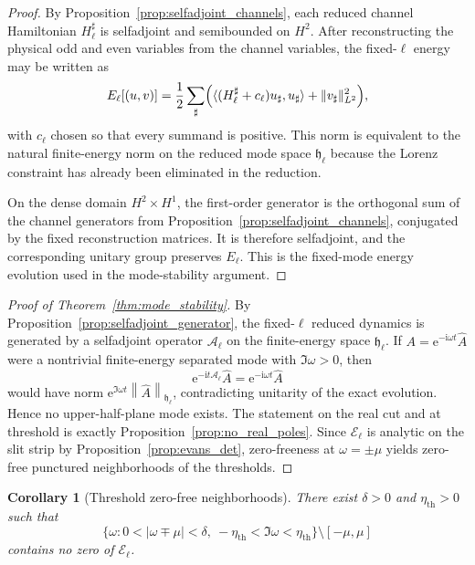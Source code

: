 \documentclass[12pt]{article}
\numberwithin{equation}{section}
\theoremstyle{plain}
\newtheorem{corollary}[theorem]{Corollary}
\theoremstyle{definition}
\theoremstyle{remark}
\newcommand{\ii}{\mathrm i}
\newcommand{\ee}{\mathrm e}
\newcommand{\cA}{\mathcal A}
\newcommand{\cE}{\mathcal E}
\newcommand{\om}{\omega}
\newcommand{\abs}[1]{\left|#1\right|}
\newcommand{\norm}[1]{\left\|#1\right\|}
\begin{document}
\begin{proof}
By Proposition~\ref{prop:selfadjoint_channels}, each reduced channel Hamiltonian $H_{\ell}^{\sharp}$ is selfadjoint and semibounded on $H^2$.  After reconstructing the physical odd and even variables from the channel variables, the fixed-$\ell$ energy may be written as
\[
   E_\ell[(u,v)]
   =\frac12\sum_{\sharp}\Bigl(\langle (H_{\ell}^{\sharp}+c_\ell)u_{\sharp},u_{\sharp}\rangle+\|v_{\sharp}\|_{L^2}^2\Bigr),
\]
with $c_\ell$ chosen so that every summand is positive.  This norm is equivalent to the natural finite-energy norm on the reduced mode space $\mathfrak h_\ell$ because the Lorenz constraint has already been eliminated in the reduction.

On the dense domain $H^2\times H^1$, the first-order generator is the orthogonal sum of the channel generators from Proposition~\ref{prop:selfadjoint_channels}, conjugated by the fixed reconstruction matrices.  It is therefore selfadjoint, and the corresponding unitary group preserves $E_\ell$.  This is the fixed-mode energy evolution used in the mode-stability argument.
\end{proof}


\begin{proof}[Proof of Theorem~\ref{thm:mode_stability}]
By Proposition~\ref{prop:selfadjoint_generator}, the fixed-$\ell$ reduced dynamics is generated by a selfadjoint operator $\cA_\ell$ on the finite-energy space $\mathfrak h_\ell$.  If $A=\ee^{-\ii\om t}\widehat A$ were a nontrivial finite-energy separated mode with $\Im\om>0$, then
\[
   \ee^{-\ii t\cA_\ell}\widehat A=\ee^{-\ii\om t}\widehat A
\]
would have norm $\ee^{\Im\om t}\norm{\widehat A}_{\mathfrak h_\ell}$, contradicting unitarity of the exact evolution.  Hence no upper-half-plane mode exists.  The statement on the real cut and at threshold is exactly Proposition~\ref{prop:no_real_poles}.  Since $\cE_\ell$ is analytic on the slit strip by Proposition~\ref{prop:evans_det}, zero-freeness at $\om=\pm\mu$ yields zero-free punctured neighborhoods of the thresholds.
\end{proof}

\begin{corollary}[Threshold zero-free neighborhoods]\label{cor:threshold_zero_free}
There exist $\delta>0$ and $\eta_{\mathrm{th}}>0$ such that
\[
   \bigl\{\om:0<\abs{\om\mp\mu}<\delta,\ -\eta_{\mathrm{th}}<\Im\om<\eta_{\mathrm{th}}\bigr\}\setminus[-\mu,\mu]
\]
contains no zero of $\cE_\ell$.
\end{corollary}
\end{document}

